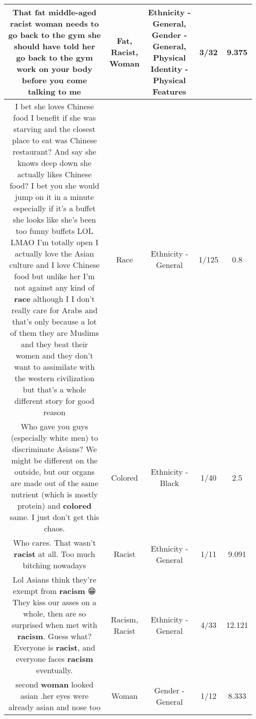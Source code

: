 \documentclass[11pt]{article}
\newlength\mylength
\begin{document}
\begin{center}
\begin{longtable}{|C{.65\mylength}|C{.30\mylength}|C{.12\mylength}|C{.12\mylength}|C{.12\mylength}|}
  \small That \textbf{fat} middle-aged \textbf{racist} \textbf{woman} needs to go back to the gym she should have told her go back to the gym work on your body before you come talking to me\normalsize   & Fat, Racist, Woman & Ethnicity - General, Gender - General, Physical Identity - Physical Features & 3/32 & 9.375 \\  \hline
  \small I bet she loves Chinese food I benefit if she was starving and the closest place to eat was Chinese restaurant? And say she knows deep down she actually likes Chinese food? I bet you she would jump on it in a minute especially if it's a buffet she looks like she's been too funny buffets LOL LMAO I'm totally open I actually love the Asian culture and I love Chinese food but unlike her I'm not against any kind of \textbf{race} although I I don't really care for Arabs and that's only because a lot of them they are Muslims and they beat their women and they don't want to assimilate with the western civilization but that's a whole different story for good reason\normalsize   & Race & Ethnicity - General & 1/125 & 0.8 \\  \hline
  \small Who gave you guys (especially white men) to discriminate Asians? We might be different on the outside, but our organs are made out of the same nutrient (which is mostly protein) and \textbf{colored} same. I just don't get this chaos.\normalsize   & Colored & Ethnicity - Black & 1/40 & 2.5 \\  \hline
  \small Who cares. That wasn't \textbf{racist} at all. Too much bitching nowadays\normalsize   & Racist & Ethnicity - General & 1/11 & 9.091 \\  \hline
  \small Lol Asians think they're exempt from \textbf{racism} 😁 They kiss our asses on a whole, then are so surprised when met with \textbf{racism}. Guess what? Everyone is \textbf{racist}, and everyone faces \textbf{racism} eventually.\normalsize   & Racism, Racist & Ethnicity - General & 4/33 & 12.121 \\  \hline
  \small second \textbf{woman} looked asian .her eyes were already asian and nose too\normalsize   & Woman & Gender - General & 1/12 & 8.333 \\  \hline

\end{longtable}
\end{center}
\end{document}
